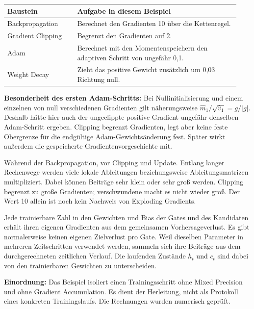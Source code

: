 \begin{center}\begin{tabular}{@{}p{0.29\linewidth}p{0.65\linewidth}@{}}\toprule
\textbf{Baustein} & \textbf{Aufgabe in diesem Beispiel}\\\midrule
Backpropagation & Berechnet den Gradienten 10 über die Kettenregel.\\[4pt]
Gradient Clipping & Begrenzt den Gradienten auf 2.\\[4pt]
Adam & Berechnet mit den Momentenspeichern den adaptiven Schritt von ungefähr 0,1.\\[4pt]
Weight Decay & Zieht das positive Gewicht zusätzlich um 0,03 Richtung null.\\\bottomrule
\end{tabular}\end{center}

\textbf{Besonderheit des ersten Adam-Schritts:} Bei Nullinitialisierung und einem einzelnen von null verschiedenen Gradienten gilt näherungsweise $\hat m_1/\sqrt{\hat v_1}=g/|g|$. Deshalb hätte hier auch der ungeclippte positive Gradient ungefähr denselben Adam-Schritt ergeben. Clipping begrenzt Gradienten, legt aber keine feste Obergrenze für die endgültige Adam-Gewichtsänderung fest. Später wirkt außerdem die gespeicherte Gradientenvorgeschichte mit.

Während der Backpropagation, vor Clipping und Update. Entlang langer Rechenwege werden viele lokale Ableitungen beziehungsweise Ableitungsmatrizen multipliziert. Dabei können Beiträge sehr klein oder sehr groß werden. Clipping begrenzt zu große Gradienten; verschwundene macht es nicht wieder groß. Der Wert 10 allein ist noch kein Nachweis von Exploding Gradients.

Jede trainierbare Zahl in den Gewichten und Bias der Gates und des Kandidaten erhält ihren eigenen Gradienten aus dem gemeinsamen Vorhersageverlust. Es gibt normalerweise keinen eigenen Zielverlust pro Gate. Weil dieselben Parameter in mehreren Zeitschritten verwendet werden, sammeln sich ihre Beiträge aus dem durchgerechneten zeitlichen Verlauf. Die laufenden Zustände $h_t$ und $c_t$ sind dabei von den trainierbaren Gewichten zu unterscheiden.

\textbf{Einordnung:} Das Beispiel isoliert einen Trainingsschritt ohne Mixed Precision und ohne Gradient Accumulation. Es dient der Herleitung, nicht als Protokoll eines konkreten Trainingslaufs. Die Rechnungen wurden numerisch geprüft.
\clearpage
